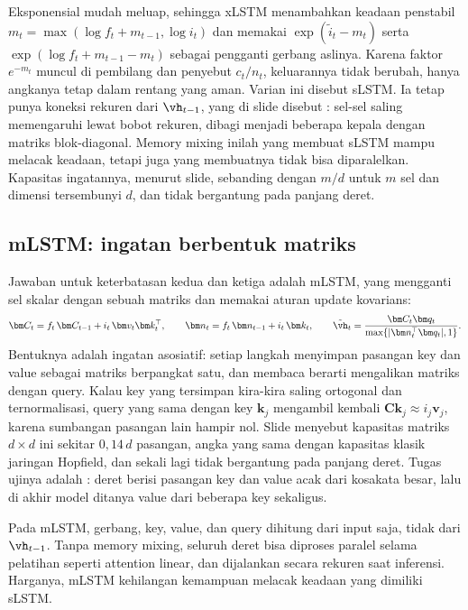 Eksponensial mudah meluap, sehingga xLSTM menambahkan keadaan penstabil $m_t=\max(\log f_t+m_{t-1},\log i_t)$ dan
memakai $\exp(\tilde i_t-m_t)$ serta $\exp(\log f_t+m_{t-1}-m_t)$ sebagai pengganti gerbang aslinya. Karena faktor
$e^{-m_t}$ muncul di pembilang dan penyebut $c_t/n_t$, keluarannya tidak berubah, hanya angkanya tetap dalam rentang
yang aman. Varian ini disebut sLSTM. Ia tetap punya koneksi rekuren dari $\vh_{t-1}$, yang di slide disebut
: sel-sel saling memengaruhi lewat bobot rekuren, dibagi menjadi beberapa kepala dengan matriks
blok-diagonal. Memory mixing inilah yang membuat sLSTM mampu melacak keadaan, tetapi juga yang membuatnya tidak bisa
diparalelkan. Kapasitas ingatannya, menurut slide, sebanding dengan $m/d$ untuk $m$ sel dan dimensi tersembunyi $d$,
dan tidak bergantung pada panjang deret.

\subsection{mLSTM: ingatan berbentuk matriks}

Jawaban untuk keterbatasan kedua dan ketiga adalah mLSTM, yang mengganti sel skalar dengan sebuah matriks dan memakai
aturan update kovarians:
\begin{equation}
\bm C_t=f_t\,\bm C_{t-1}+i_t\,\bm v_t\bm k_t^\top,\qquad
\bm n_t=f_t\,\bm n_{t-1}+i_t\,\bm k_t,\qquad
\tilde{\vh}_t=\frac{\bm C_t\bm q_t}{\max\{|\bm n_t^\top\bm q_t|,1\}}.
\end{equation}
Bentuknya adalah ingatan asosiatif: setiap langkah menyimpan pasangan key dan value sebagai matriks berpangkat satu,
dan membaca berarti mengalikan matriks dengan query. Kalau key yang tersimpan kira-kira saling ortogonal dan
ternormalisasi, query yang sama dengan key $\bm k_j$ mengambil kembali $\bm C\bm k_j\approx i_j\bm v_j$, karena
sumbangan pasangan lain hampir nol. Slide menyebut kapasitas matriks $d\times d$ ini sekitar $0{,}14\,d$ pasangan,
angka yang sama dengan kapasitas klasik jaringan Hopfield, dan sekali lagi tidak bergantung pada panjang deret. Tugas
ujinya adalah : deret berisi pasangan key dan value acak dari kosakata besar,
lalu di akhir model ditanya value dari beberapa key sekaligus.

Pada mLSTM, gerbang, key, value, dan query dihitung dari input saja, tidak dari $\vh_{t-1}$. Tanpa memory mixing, seluruh
deret bisa diproses paralel selama pelatihan seperti attention linear, dan dijalankan secara rekuren saat inferensi.
Harganya, mLSTM kehilangan kemampuan melacak keadaan yang dimiliki sLSTM.

